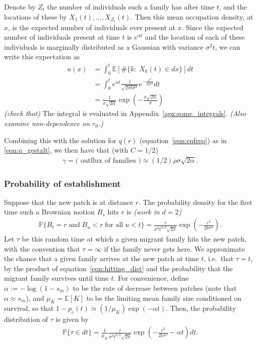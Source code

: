 \documentclass{article}
\renewcommand{\P}{\mathbb{P}}
\newcommand{\E}{\mathbb{E}}
\newcommand{\deq}{\stackrel{\scriptscriptstyle{d}}{=}}
\newcommand{\plr}[1]{{\it\color{blue}(#1)}}
\begin{document}
Denote by $Z_t$ the number of individuals such a family has after time $t$,
and the locations of these by $X_1(t), \ldots, X_{Z_t}(t)$.
Then this mean occupation density, at $x$, is the expected number of individuals ever present at $x$. 
Since the expected number of individuals present at time $t$ is $e^{\alpha t}$
and the location of each of these individuals is marginally distributed as a  Gaussian with variance $\sigma^2 t$,
we can write this expectation as
\begin{align}
    u(x) &= \int_0^t \E[ \#\{ k : \; X_k(t) \in dx \} ] dt \\
    &= \int_0^t e^{\alpha t} \frac{1}{\sqrt{2 \pi t \sigma^2}} e^{-\frac{x^2}{2t\sigma^2}} dt \\
    &= \frac{ 1 }{ \sigma \sqrt{2 \alpha} } \exp\left( - \frac{ x \sqrt{2\alpha} }{ \sigma } \right) 
\end{align}
\plr{check that}
The integral is evaluated in Appendix~\ref{apx:some_integrals}.
\plr{Also examine non-dependence on $r_0$.}

Combining this with the solution for $q(r)$ (equation~\eqref{eqn:eqfreq}) as in \eqref{eqn:q_gestalt},
we then have that (with $C=1/2$)
\begin{align} \label{eqn:outflux}
    \gamma = \text{( outflux of families )} \approx (1/2) \rho \sigma \sqrt{2\alpha} .
\end{align}

\subsubsection*{Probability of establishment}

Suppose that the new patch is at distance $r$.
The probability density for the first time such a Brownian motion $B_s$ hits $r$ is
\citep[XXX]{feller}
\plr{work in $d=2$}
\begin{align} \label{eqn:hitting_dist}
  \P\{ B_t=r \;\mbox{and} \; B_u<r \;\mbox{for all}\; u<t\} =  \frac{r}{\sigma^3 t^{3/2}\sqrt{2\pi}} \exp\left(-\frac{r^2}{2t\sigma^2}\right) .
\end{align}
Let $\tau$ be this random time at which a given migrant family hits the new patch,
with the convention that $\tau =\infty$ if the family never gets here.
We approximate the chance that a given family arrives at the new patch at time $t$, i.e.\ that $\tau=t$,
by the product of equation~\eqref{eqn:hitting_dist} and the probability that the migrant family survives until time $t$.
For convenience, define $\alpha := - \log(1-s_m)$ to be the rate of decrease between patches (note that $\alpha \approx s_m$),
and $\mu_K = \E[K]$ to be the limiting mean family size conditioned on survival,
so that $1-p_e(t) \simeq (1/\mu_K) \exp(-\alpha t)$.
Then, the probability distribution of $\tau$ is given by
\begin{align}
    \P\{ \tau \in dt \} =  \frac{1}{\mu_K} \frac{r}{\sigma^3 t^{3/2}\sqrt{2\pi}} \exp\left(-\frac{r^2}{2t\sigma^2} - \alpha t \right) dt  .
\end{align}
\end{document}
